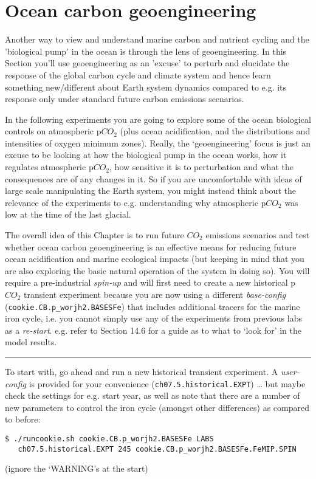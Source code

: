 \section{Ocean carbon geoengineering}

\noindent Another way to view and understand marine carbon and nutrient cycling and the 'biological pump' in the ocean is through the lens of geoengineering. In this Section you'll use geoengineering as an 'excuse' to perturb and elucidate the response of the global carbon cycle and climate system and hence learn something new/different about Earth system dynamics compared to e.g. its response only under standard future carbon emissions scenarios.

In the following experiments you are going to explore some of the ocean biological controls on atmospheric p\(CO_{2}\) (plus ocean acidification, and the distributions and intensities of oxygen minimum zones). Really, the ‘geoengineering’ focus is just an excuse to be looking at how the biological pump in the ocean works, how it regulates atmospheric p\(CO_{2}\), how sensitive it is to perturbation and what the consequences are of any changes in it. So if you are uncomfortable with ideas of large scale manipulating the Earth system, you might instead think about the relevance of the experiments to e.g. understanding why atmospheric p\(CO_{2}\) was low at the time of the last glacial.

The overall idea of this Chapter is to run future \(CO_{2}\) emissions scenarios and test whether ocean carbon geoengineering is an effective means for reducing future ocean acidification and marine ecological impacts (but keeping in mind that you are also exploring the basic natural operation of the system in doing so). You will require a pre-industrial \textit{spin-up} and will first need to create a new historical p\(CO_{2}\) transient experiment because you are now using a different \textit{base-config} (\texttt{cookie.CB.p\_worjh2.BASESFe}) that includes additional tracers for the marine iron cycle, i.e. you cannot simply use any of the experiments from previous labs as a \textit{re-start}. e.g. refer to Section 14.6  for a guide as to what to ‘look for’ in the model results.

\vspace{1mm}
\noindent\rule{4cm}{0.1mm}
\vspace{2mm}

\noindent To start with, go ahead and run a new historical transient experiment. A \textit{user-config} is provided for your convenience (\texttt{ch07.5.historical.EXPT}) … but maybe check the settings for e.g. start year, as well as note that there are a number of new parameters to control the iron cycle (amongst other differences) as compared to before:
\vspace{-2pt}\begin{verbatim}
$ ./runcookie.sh cookie.CB.p_worjh2.BASESFe LABS
   ch07.5.historical.EXPT 245 cookie.CB.p_worjh2.BASESFe.FeMIP.SPIN
\end{verbatim}\vspace{-2pt}
(ignore the ‘WARNING’s at the start)

